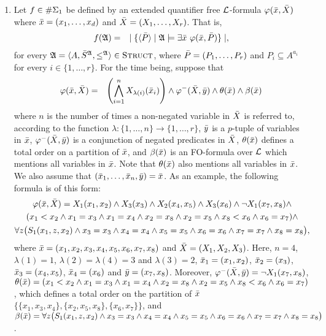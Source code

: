 \begin{enumerate}
	\item Let $f \in \E{1}$ be defined by an extended quantifier free $\L$-formula $\varphi(\x,\X)$ where $\x = (x_1,\dots,x_d)$ and $\X = (X_1,\dots,X_r)$. That is,
	\begin{eqnarray*}
		f(\A) &=& \mid \{ \langle\P\rangle \mid \A \models \exists \x \ \varphi(\x,\P) \} \mid \label{f1},
	\end{eqnarray*}
	for every $\A = \langle A, \S^{\A}, \leq^{\A} \rangle \in \str$, where $\P = (P_1,\ldots,P_r)$ and $P_i \subseteq A^{a_i}$ for every $i \in \{1,\ldots,r\}$. For the time being, suppose that
	\begin{eqnarray}
	\varphi(\x,\X) &=& \left( \bigwedge_{i=1}^n X_{\lambda(i)}(\x_i) \right) \wedge \varphi^{-}(\X,\y) \wedge \theta(\x) \wedge \beta(\x)
	\end{eqnarray}
	where $n$ is the number of times a non-negated variable in $\X$ is referred to, according to the function $\lambda:\{1,\ldots,n\}\to\{1,\ldots,r\}$, $\y$ is a $p$-tuple of variables in $\x$, $\varphi^{-}(\X,\y)$ is a conjunction of negated predicates in $\X$, $\theta(\x)$ defines a total order on a partition of $\x$, and $\beta(\x)$ is an FO-formula over $\L$ which mentions all variables in $\x$. Note that $\theta(\x)$ also mentions all variables in $\x$. We also assume that $(\x_1,\dots,\x_n,\y) = \x$. As an example, the following formula is of this form:
	\begin{multline*}
	\varphi(\x,\X) =  X_1(x_1,x_2) \wedge X_3(x_3) \wedge X_2(x_4,x_5) \wedge X_3(x_6) \wedge \neg X_1(x_7,x_8) \wedge \\ (x_1 < x_2 \wedge x_1 = x_3 \wedge x_1 = x_4 \wedge x_2 = x_8 \wedge x_2 = x_5 \wedge x_8 < x_6 \wedge x_6 = x_7 ) \wedge \\ \forall z\big( S_1(x_1,z,x_2) \wedge x_3 = x_3 \wedge x_4 = x_4 \wedge x_5 = x_5 \wedge x_6 = x_6 \wedge x_7 = x_7 \wedge x_8 = x_8 \big),
	\end{multline*}
	where $\x = (x_1,x_2,x_3,x_4,x_5,x_6,x_7,x_8)$ and $\X = (X_1,X_2,X_3)$. Here, $n = 4$, $\lambda(1) = 1$, $\lambda(2) = \lambda(4) = 3$ and $\lambda(3) = 2$, $\x_1 = (x_1,x_2)$, $\x_2 = (x_3)$, $\x_3 = (x_4,x_5)$, $\x_4 = (x_6)$ and $\y = (x_7,x_8)$. Moreover, $\varphi^{-}(\X,\y) = \neg X_1(x_7,x_8)$, $\theta(\x) = (x_1 < x_2 \wedge x_1 = x_3 \wedge x_1 = x_4 \wedge x_2 = x_8 \wedge x_2 = x_5 \wedge x_8 < x_6 \wedge x_6 = x_7 )$, which defines a total order on the partition of $\x$ $\{\{x_1,x_3,x_4\},\{x_2,x_5,x_8\},\{x_6,x_7\}\}$, and $\beta(\x) = \forall z\big( S_1(x_1,z,x_2) \wedge x_3 = x_3 \wedge x_4 = x_4 \wedge x_5 = x_5 \wedge x_6 = x_6 \wedge x_7 = x_7 \wedge x_8 = x_8 \big)$.
	

\end{enumerate}

